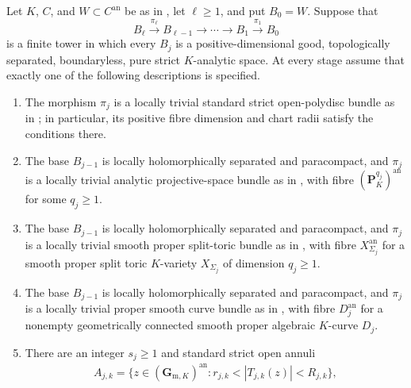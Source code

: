 \begin{theorem}
\label{thm:p062-interleaved-polyannulus-mixed-bundle-towers}
Let $K$, $C$, and $W\subset C^{\mathrm{an}}$ be as in
, let $\ell\geq1$, and put $B_0=W$.
Suppose that
\[
 B_\ell\xrightarrow{\pi_\ell}B_{\ell-1}
 \longrightarrow\cdots\longrightarrow B_1
 \xrightarrow{\pi_1}B_0
\]
is a finite tower in which every $B_j$ is a positive-dimensional good,
topologically separated, boundaryless, pure strict $K$-analytic space.  At
every stage assume that exactly one of the following descriptions is
specified.
\begin{enumerate}
\item The morphism $\pi_j$ is a locally trivial standard strict
open-polydisc bundle as in
; in particular, its positive
fibre dimension and chart radii satisfy the conditions there.
\item The base $B_{j-1}$ is locally holomorphically separated and
paracompact, and $\pi_j$ is a locally trivial analytic projective-space
bundle as in , with fibre
$(\mathbf P_K^{q_j})^{\mathrm{an}}$ for some $q_j\geq1$.
\item The base $B_{j-1}$ is locally holomorphically separated and
paracompact, and $\pi_j$ is a locally trivial smooth proper split-toric
bundle as in
, with fibre
$X_{\Sigma_j}^{\mathrm{an}}$ for a smooth proper split toric $K$-variety
$X_{\Sigma_j}$ of dimension $q_j\geq1$.
\item The base $B_{j-1}$ is locally holomorphically separated and
paracompact, and $\pi_j$ is a locally trivial proper smooth curve bundle as
in , with fibre
$D_j^{\mathrm{an}}$ for a nonempty geometrically connected smooth proper
algebraic $K$-curve $D_j$.
\item There are an integer $s_j\geq1$ and standard strict open annuli
\[
 \begin{gathered}
 A_{j,k}=\{z\in(\mathbf G_{\mathrm m,K})^{\mathrm{an}}:
                 r_{j,k}<|T_{j,k}(z)|<R_{j,k}\},\\

\end{gathered}\]
\end{enumerate}
\end{theorem}
